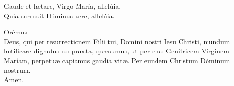 \begin{multicols}{2}

\setlength{\parskip}{0.5em}
\V Gaude et lætare, Virgo María, allelúia.\\
\R Quia surrexit Dóminus vere, allelúia.

Orémus.\\
Deus, qui per resurrectionem Filii tui, Domini nostri Iesu Christi,
mundum lætificare dignatus es:
præsta, quæsumus, ut per eius Genitricem Virginem Maríam,
perpetuæ capiamus gaudia vitæ.
Per eundem Christum Dóminum nostrum.\\
\R Amen.
\setlength{\parskip}{0.5em}

\end{multicols}
